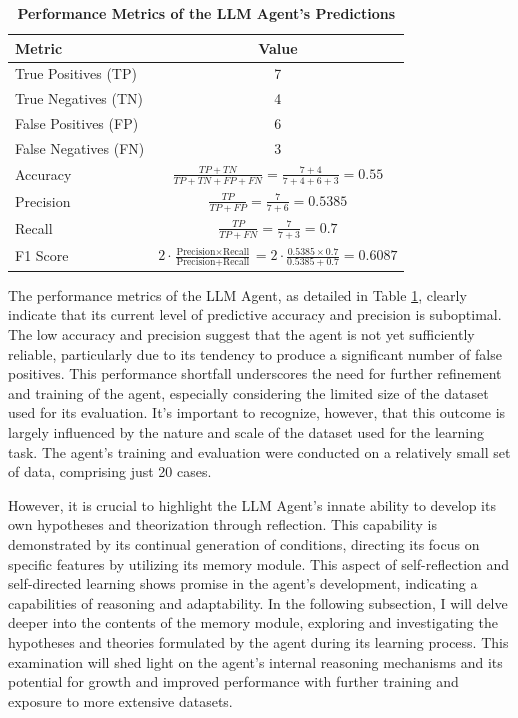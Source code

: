 \documentclass[15pt,letterpaper]{article}
\begin{document}
  \begin{table}[h]
    \centering
    \caption{\textbf{Performance Metrics of the LLM Agent's Predictions}}
    \begin{tabular}{|l|c|}
    \hline
    \textbf{Metric} & \textbf{Value} \\
    \hline
    True Positives (TP) & 7 \\
    True Negatives (TN) & 4 \\
    False Positives (FP) & 6 \\
    False Negatives (FN) & 3 \\
    \hline
    Accuracy & $\frac{TP + TN}{TP + TN + FP + FN} = \frac{7 + 4}{7 + 4 + 6 + 3} = 0.55$ \\
    Precision & $\frac{TP}{TP + FP} = \frac{7}{7 + 6} = 0.5385$ \\
    Recall & $\frac{TP}{TP + FN} = \frac{7}{7 + 3} = 0.7$ \\
    F1 Score & $2 \cdot \frac{\text{Precision} \times \text{Recall}}{\text{Precision} + \text{Recall}} = 2 \cdot \frac{0.5385 \times 0.7}{0.5385 + 0.7} = 0.6087$ \\
    \hline
    \end{tabular}
    \label{tab:metrics}
    \end{table}
  
The performance metrics of the LLM Agent, as detailed in Table \ref{tab:metrics}, clearly indicate that its current level of predictive accuracy and precision is suboptimal. 
The low accuracy and precision suggest that the agent is not yet sufficiently reliable, particularly due to its tendency to produce a significant number of false positives. 
This performance shortfall underscores the need for further refinement and training of the agent, especially considering the limited size of the dataset used for its evaluation.
It's important to recognize, however, that this outcome is largely influenced by the nature and scale of the dataset used for the learning task. The agent's training and evaluation were conducted on a relatively small set of data, comprising just 20 cases.

However, it is crucial to highlight the LLM Agent's innate ability to develop its own hypotheses and theorization through reflection. This capability is demonstrated by its continual generation of conditions, directing its focus on specific features by utilizing its memory module. This aspect of self-reflection and self-directed learning shows promise in the agent's development, indicating a capabilities of reasoning and adaptability. 
In the following subsection, I will delve deeper into the contents of the memory module, exploring and investigating the hypotheses and theories formulated by the agent during its learning process. This examination will shed light on the agent's internal reasoning mechanisms and its potential for growth and improved performance with further training and exposure to more extensive datasets.
\end{document}
